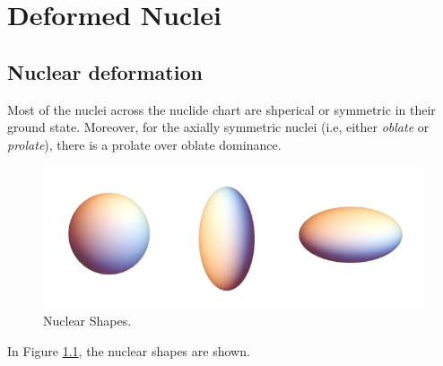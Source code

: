 \chapter{Deformed Nuclei}

\section{Nuclear deformation}

Most of the nuclei across the nuclide chart are shperical or symmetric in their ground state. Moreover, for the axially symmetric nuclei (i.e, either \emph{oblate} or \emph{prolate}), there is a prolate over oblate dominance.

\begin{figure}[ht]
    \centering
    \includegraphics[scale=0.3]{Chapters/Figures/nuclear_shapes.png}
    \caption{Nuclear Shapes.}
    \label{nuclear_shapes}
\end{figure}

In Figure \ref{nuclear_shapes}, the nuclear shapes are shown.